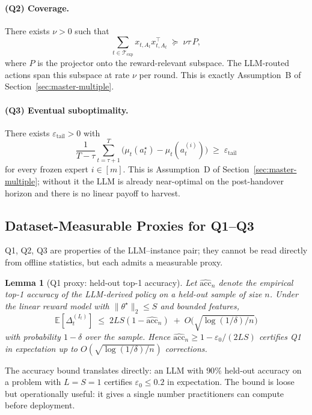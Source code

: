 \documentclass{article}
\newtheorem{lemma}{Lemma}
\theoremstyle{definition}
\theoremstyle{remark}
\theoremstyle{remark}
\begin{document}
\paragraph{(Q2) Coverage.}\label{q:coverage}
There exists $\nu>0$ such that
\[
\sum_{t\in\mathcal T_{\mathrm{exp}}} x_{t,A_t}x_{t,A_t}^\top
\;\succeq\; \nu\tau\,P,
\]
where $P$ is the projector onto the reward-relevant subspace. The
LLM-routed actions span this subspace at rate $\nu$ per round. This is
exactly Assumption~B of Section~\ref{sec:master-multiple}.

\paragraph{(Q3) Eventual suboptimality.}\label{q:tail-suboptimality}
There exists $\varepsilon_{\mathrm{tail}}>0$ with
\[
\frac{1}{T-\tau}\sum_{t=\tau+1}^T\bigl(\mu_t(a_t^\star)-\mu_t(a_t^{(i)})\bigr)
\;\ge\; \varepsilon_{\mathrm{tail}}
\]
for every frozen expert $i\in[m]$. This is Assumption~D of
Section~\ref{sec:master-multiple}; without it the LLM is
already near-optimal on the post-handover horizon and there is no
linear payoff to harvest.

\subsection{Dataset-Measurable Proxies for Q1--Q3}
\label{app:q-proxies}

Q1, Q2, Q3 are properties of the LLM--instance pair; they cannot be
read directly from offline statistics, but each admits a measurable
proxy.

\begin{lemma}[Q1 proxy: held-out top-1 accuracy]
\label{lem:q1-proxy}
Let $\widehat{\mathrm{acc}}_n$ denote the empirical top-1 accuracy of
the LLM-derived policy on a held-out sample of size $n$. Under the
linear reward model with $\|\theta^\star\|_2\le S$ and bounded features,
\[
\mathbb E[\Delta_t^{(I_t)}]
\;\le\; 2LS(1-\widehat{\mathrm{acc}}_n)
\;+\; O\!\bigl(\sqrt{\log(1/\delta)/n}\bigr)
\]
with probability $1-\delta$ over the sample. Hence
$\widehat{\mathrm{acc}}_n \ge 1-\varepsilon_0/(2LS)$ certifies Q1 in
expectation up to $O(\sqrt{\log(1/\delta)/n})$ corrections.
\end{lemma}

The accuracy bound translates directly: an LLM with $90\%$ held-out
accuracy on a problem with $L=S=1$ certifies $\varepsilon_0\le 0.2$ in
expectation. The bound is loose but operationally useful: it gives a
single number practitioners can compute before deployment.
\end{document}
